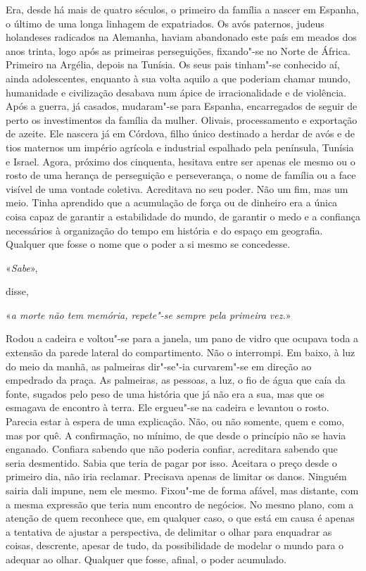 Era, desde há mais de quatro séculos, o primeiro da família a nascer em
Espanha, o último de uma longa linhagem de expatriados. Os avós
paternos, judeus holandeses radicados na Alemanha, haviam abandonado
este país em meados dos anos trinta, logo após as primeiras
perseguições, fixando"-se no Norte de África. Primeiro na Argélia,
depois na Tunísia. Os seus pais tinham"-se conhecido aí, ainda
adolescentes, enquanto à sua volta aquilo a que poderiam chamar mundo,
humanidade e civilização desabava num ápice de irracionalidade e de
violência. Após a guerra, já casados, mudaram"-se para Espanha,
encarregados de seguir de perto os investimentos da família da mulher.
Olivais, processamento e exportação de azeite. Ele nascera já em
Córdova, filho único destinado a herdar de avós e de tios maternos um
império agrícola e industrial espalhado pela península, Tunísia e
Israel. Agora, próximo dos cinquenta, hesitava entre ser apenas ele
mesmo ou o rosto de uma herança de perseguição e perseverança, o nome de
família ou a face visível de uma vontade coletiva. Acreditava no seu
poder. Não um fim, mas um meio. Tinha aprendido que a acumulação de
força ou de dinheiro era a única coisa capaz de garantir a estabilidade
do mundo, de garantir o medo e a confiança necessários à organização do
tempo em história e do espaço em geografia. Qualquer que fosse o nome
que o poder a si mesmo se concedesse.

«\emph{Sabe}»,

disse,

«\emph{a morte não tem memória, repete"-se sempre pela primeira vez.}»

Rodou a cadeira e voltou"-se para a janela, um pano de vidro que ocupava
toda a extensão da parede lateral do compartimento. Não o interrompi. Em
baixo, à luz do meio da manhã, as palmeiras dir"-se"-ia curvarem"-se em
direção ao empedrado da praça. As palmeiras, as pessoas, a luz, o fio
de água que caía da fonte, sugados pelo peso de uma história que já não
era a sua, mas que os esmagava de encontro à terra. Ele ergueu"-se na
cadeira e levantou o rosto. Parecia estar à espera de uma explicação.
Não, ou não somente, quem e como, mas por quê. A confirmação, no mínimo,
de que desde o princípio não se havia enganado. Confiara sabendo que não
poderia confiar, acreditara sabendo que seria desmentido. Sabia que
teria de pagar por isso. Aceitara o preço desde o primeiro dia, não iria
reclamar. Precisava apenas de limitar os danos. Ninguém sairia dali
impune, nem ele mesmo. Fixou"-me de forma afável, mas distante, com a
mesma expressão que teria num encontro de negócios. No mesmo plano, com
a atenção de quem reconhece que, em qualquer caso, o que está em causa é
apenas a tentativa de ajustar a perspectiva, de delimitar o olhar para
enquadrar as coisas, descrente, apesar de tudo, da possibilidade de
modelar o mundo para o adequar ao olhar. Qualquer que fosse, afinal, o
poder acumulado.

